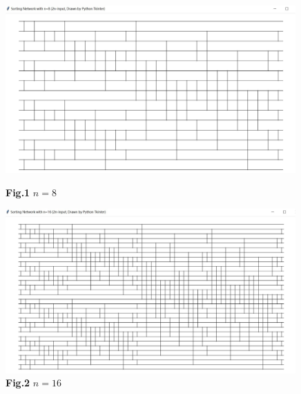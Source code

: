 \documentclass[12pt,a4paper,UTF8]{article}
\theoremstyle{definition}
\begin{document}
\begin{enumerate}
\begin{enumerate}
    	\begin{figure}[htbp]
    		\begin{minipage}[h]{0.48\textwidth}
    			\centering
    			\includegraphics[width=0.99\textwidth]{Lab02-YijiaDiao-8.pdf}
    			\caption*{\textbf{Fig.1} $n = 8$} \label{Fig-8}
    		\end{minipage}
    		\hspace{5mm}
    		\begin{minipage}[h]{0.52\textwidth}
    			\centering
    			\includegraphics[width=0.99\textwidth]{Lab02-YijiaDiao-16.pdf}
    			\caption*{\textbf{Fig.2} $n = 16$} \label{Fig-16}
    		\end{minipage}
    	\end{figure}
    

\end{enumerate}
\end{enumerate}
\end{document}
